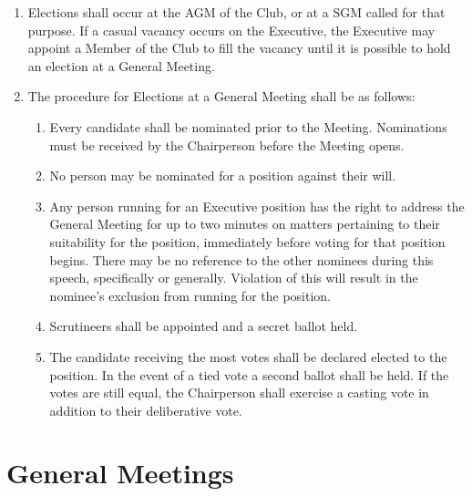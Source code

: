 \documentclass[a4paper]{article}
\begin{document}
	\begin{enumerate}
		\item Elections shall occur at the \ac{AGM} of the Club, or at a \ac{SGM} called for that purpose.
		If a casual vacancy occurs on the Executive, the Executive may appoint a Member of the Club to fill the vacancy until it is possible to hold an election at a General Meeting.
		
		\item The procedure for Elections at a General Meeting shall be as follows:
		\begin{enumerate}
			\item Every candidate shall be nominated prior to the Meeting. Nominations must be received by the Chairperson before the Meeting opens.
			
			\item No person may be nominated for a position against their will.
			
			\item Any person running for an Executive position has the right to address the General Meeting for up to two minutes on matters pertaining to their suitability for the position, immediately before voting for that position begins.
			There may be no reference to the other nominees during this speech, specifically or generally.
			Violation of this will result in the nominee's exclusion from running for the position.
			
			\item Scrutineers shall be appointed and a secret ballot held.
			
			\item The candidate receiving the most votes shall be declared elected to the position.
			In the event of a tied vote a second ballot shall be held.
			If the votes are still equal, the Chairperson shall exercise a casting vote in addition to their deliberative vote.
		\end{enumerate}
	\end{enumerate}
	
	\section{General Meetings}
	
\end{document}
